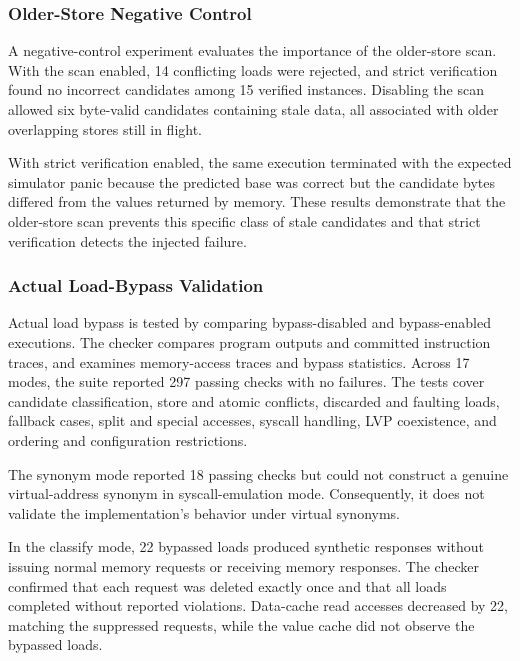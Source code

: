 \subsubsection{Older-Store Negative Control}
\label{subsubsec:vastra-negative-control}

A negative-control experiment evaluates the importance of the
older-store scan. With the scan enabled, 14 conflicting loads were
rejected, and strict verification found no incorrect candidates
among 15 verified instances. Disabling the scan allowed six
byte-valid candidates containing stale data, all associated with
older overlapping stores still in flight.

With strict verification enabled, the same execution terminated
with the expected simulator panic because the predicted base was
correct but the candidate bytes differed from the values returned
by memory. These results demonstrate that the older-store scan
prevents this specific class of stale candidates and that strict
verification detects the injected failure.

\subsubsection{Actual Load-Bypass Validation}
\label{subsubsec:vastra-bypass-validation}

Actual load bypass is tested by comparing bypass-disabled and
bypass-enabled executions.
The checker compares program outputs and committed instruction traces,
and examines memory-access traces and bypass statistics. Across 17 modes,
the suite reported 297 passing checks with no failures. The tests
cover candidate classification, store and atomic conflicts,
discarded and faulting loads, fallback cases, split and special
accesses, syscall handling, LVP coexistence, and ordering and
configuration restrictions.

The synonym mode reported 18 passing checks but could not construct
a genuine virtual-address synonym in syscall-emulation mode.
Consequently, it does not validate the implementation's behavior
under virtual synonyms.

In the classify mode, 22 bypassed loads produced synthetic responses
without issuing normal memory requests or receiving memory responses.
The checker confirmed that each request was deleted exactly once and
that all loads completed without reported violations. Data-cache read
accesses decreased by 22, matching the suppressed requests, while
the value cache did not observe the bypassed loads.

